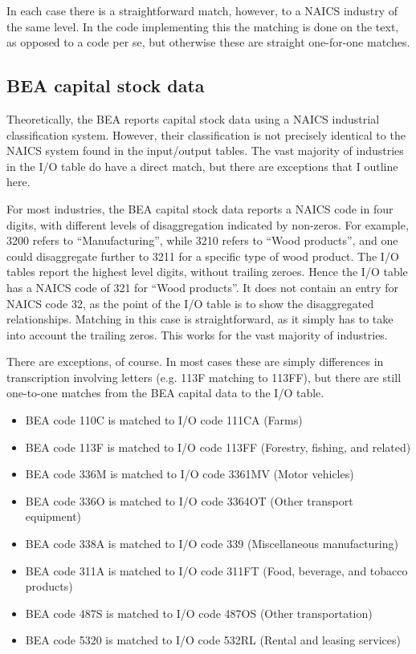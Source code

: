 \documentclass[11pt]{article}
\begin{document}
In each case there is a straightforward match, however, to a NAICS industry of the same level. In the code implementing this the matching is done on the text, as opposed to a code per se, but otherwise these are straight one-for-one matches.

\subsection{BEA capital stock data}
Theoretically, the BEA reports capital stock data using a NAICS industrial classification system. However, their classification is not precisely identical to the NAICS system found in the input/output tables. The vast majority of industries in the I/O table do have a direct match, but there are exceptions that I outline here. 

For most industries, the BEA capital stock data reports a NAICS code in four digits, with different levels of disaggregation indicated by non-zeros. For example, 3200 refers to ``Manufacturing'', while 3210 refers to ``Wood products'', and one could disaggregate further to 3211 for a specific type of wood product. The I/O tables report the highest level digits, without trailing zeroes. Hence the I/O table has a NAICS code of 321 for ``Wood products''. It does not contain an entry for NAICS code 32, as the point of the I/O table is to show the disaggregated relationships. Matching in this case is straightforward, as it simply has to take into account the trailing zeros. This works for the vast majority of industries. 

There are exceptions, of course. In most cases these are simply differences in transcription involving letters (e.g. 113F matching to 113FF), but there are still one-to-one matches from the BEA capital data to the I/O table.

\begin{itemize}
	\item BEA code 110C is matched to I/O code 111CA (Farms)
	\item BEA code 113F is matched to I/O code 113FF (Forestry, fishing, and related)
	\item BEA code 336M is matched to I/O code 3361MV (Motor vehicles)
	\item BEA code 336O is matched to I/O code 3364OT (Other transport equipment)
	\item BEA code 338A is matched to I/O code 339 (Miscellaneous manufacturing)
	\item BEA code 311A is matched to I/O code 311FT (Food, beverage, and tobacco products)
	\item BEA code 487S is matched to I/O code 487OS (Other transportation)
	\item BEA code 5320 is matched to I/O code 532RL (Rental and leasing services)
\end{itemize}
\end{document}
